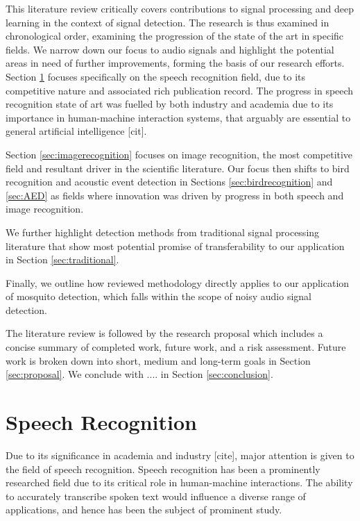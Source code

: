 \documentclass[12pt]{llncs}
\begin{document}
This literature review critically covers contributions to signal processing and deep learning in the context of signal detection.
The research is thus  examined in chronological order, examining the progression of the state of the art in specific fields. We narrow down our focus to audio signals and highlight the potential areas in need of further improvements, forming the basis of our research efforts. Section \ref{sec:speechrecognition} focuses specifically on the speech recognition field, due to its competitive nature and associated rich publication record. The progress in speech recognition state of art was fuelled by both industry and academia due to its importance in human-machine interaction systems, that arguably are essential to general artificial intelligence [cit].

Section \ref{sec:imagerecognition} focuses on image recognition, the most competitive field and resultant driver in the scientific literature.
Our focus then shifts to bird recognition and acoustic event detection in Sections \ref{sec:birdrecognition} and \ref{sec:AED} as fields where innovation was driven by progress in both speech and image recognition.

We further highlight detection methods from traditional signal  processing literature  that show most potential promise of transferability to our application in Section  \ref{sec:traditional}.

Finally, we outline how reviewed methodology directly applies to our application of mosquito detection, which falls within the scope of noisy audio signal detection.


The literature review is followed by the research proposal which includes a concise summary of completed work, future work, and a risk assessment. Future work is broken down into short, medium and long-term goals in Section \ref{sec:proposal}. We conclude with .... in Section \ref{sec:conclusion}.



\section{Speech Recognition}
\label{sec:speechrecognition}
Due to its significance in academia and industry [cite], major attention is given to the field of speech recognition. Speech recognition has been a prominently researched field due to its critical role in human-machine interactions. The ability to accurately transcribe spoken text would influence a diverse range of applications, and hence has been the subject of prominent study. 
\end{document}
